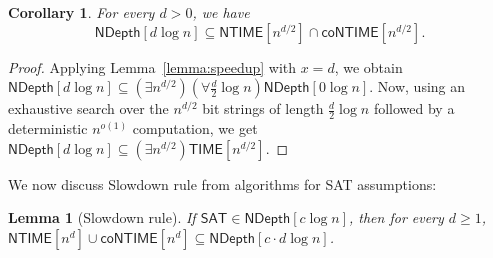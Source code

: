 \documentclass[a4paper, 11pt]{article}
\theoremstyle{plain}
\newtheorem{lemma}[theorem]{Lemma}
\newtheorem{corollary}[theorem]{Corollary}
\theoremstyle{definition}
\theoremstyle{remark}
\newcommand{\TIME}{\textsf{TIME}}%
\newcommand{\NTIME}{\textsf{NTIME}}%
\newcommand{\coNTIME}{\textsf{coNTIME}}%
\newcommand{\SAT}{\textsf{SAT}}%
\newcommand{\ND}{\textsf{NDepth}}%
\newcommand{\NDL}[1]{\ND[ #1 \log n]}%
\begin{document}
\begin{corollary}\label{cor:speedup}
	For every $d > 0$, we have
	\[\NDL{d} \subseteq \NTIME[n^{d/2}] \cap \coNTIME[n^{d/2}].\]
\end{corollary}
\begin{proof}
	Applying Lemma~\ref{lemma:speedup} with $x = d$, we obtain
	$\NDL{d} \subseteq (\exists n^{d/2}) (\forall \frac{d}{2}\log n) \NDL{0}$.
	Now, using an exhaustive search over the $n^{d/2}$ bit strings of length $\frac{d}{2}\log n$
	followed by a deterministic $n^{o(1)}$ computation,
	we get
	$\NDL{d} \subseteq (\exists n^{d/2}) \TIME[n^{d/2}]$.
\end{proof}


We now discuss
Slowdown rule from algorithms for SAT assumptions:
\begin{lemma}[Slowdown rule]\label{lemma:slowdown}
	If $\SAT{}\in \NDL{c}$, then for every $d \ge 1$, $\NTIME[n^d] \cup \coNTIME[n^d] \subseteq \NDL{c\cdot d}$.
\end{lemma}
\end{document}
